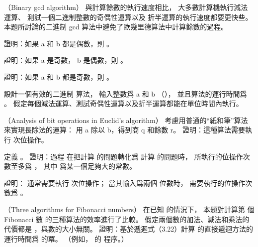 \startsubject[
  title={Problems},
]

\startPROBLEM
（Binary gcd algorithm）
與計算餘數的執行速度相比，
大多數計算機執行減法運算、
測試一個二進制整數的奇偶性運算以及
折半運算的執行速度都要更快些。
本題所討論的{\EMP 二進制 gcd 算法}中避免了歐幾里德算法中計算餘數的過程。

\startigBase[a]\startitem
證明：如果 a 和 b 都是偶數，則 。
\stopitem\stopigBase

\startANSWER
{}
\stopANSWER

\startigBase[continue]\startitem
證明：如果 a 是奇數， b 是偶數，則 。
\stopitem\stopigBase

\startANSWER
{}
\stopANSWER

\startigBase[continue]\startitem
證明：如果 a 和 b 都是奇數，則 。
\stopitem\stopigBase

\startANSWER
{}
\stopANSWER

\startigBase[continue]\startitem
設計一個有效的二進制 \m{\gcd} 算法，
輸入整數爲 a 和 b （），
並且算法的運行時間爲 。
假定每個減法運算、測試奇偶性運算以及折半運算都能在單位時間內執行。
\stopitem\stopigBase

\startANSWER
{}
\stopANSWER
\stopPROBLEM

\startPROBLEM
（Analysis of bit operations in Euclid’s algorithm）
\startigBase[a]\startitem
考慮用普通的“紙和筆”算法來實現長除法的運算：
用 a 除以 b，得到商 q 和餘數 r。
證明：這種算法需要執行  次位操作。
\stopitem\stopigBase

\startANSWER
{}
\stopANSWER

\startigBase[continue]\startitem
定義 。
證明：過程  在把計算  的問題轉化爲
計算  的問題時，
所執行的位操作次數至多爲 ，
其中  爲某一個足夠大的常數。
\stopitem\stopigBase

\startANSWER
{}
\stopANSWER

\startigBase[continue]\startitem
證明：  通常需要執行  次位操作；
當其輸入爲兩個 \m{\beta} 位數時，
需要執行的位操作次數爲 。
\stopitem\stopigBase

\startANSWER
{}
\stopANSWER
\stopPROBLEM

\startPROBLEM
（Three algorithms for Fibonacci numbers）
在已知  的情況下，
本題對計算第  個 Fibonacci 數  的三種算法的效率進行了比較。
假定兩個數的加法、減法和乘法的代價都是 ，與數的大小無關。
\startigBase[a]\startitem
證明：基於遞迴式（3.22）計算  的直接遞迴方法的運行時間爲  的冪。
（例如， 的  程序。）
\stopitem\stopigBase


